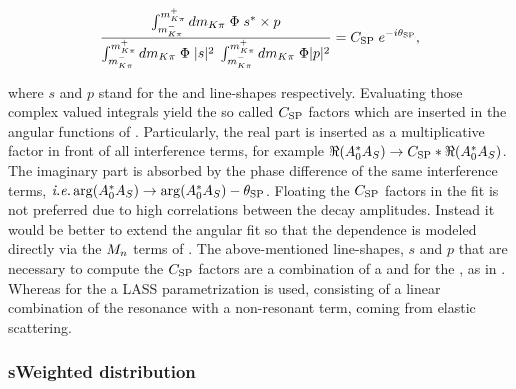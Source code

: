\begin{equation}
  \centering
  \label{csp_def}
  \frac{\int_{\mkpi^-}^{\mkpi^+} d\mkpi \; \Phi \; s^* \times p} {\int_{\mkpi^-}^{\mkpi^+} d\mkpi \; \Phi \; |s|^2 \; \int_{\mkpi^-}^{\mkpi^+} d\mkpi \; \Phi |p|^2} = \CSP \; e^{-i\ThetaSP},
\end{equation}

\noindent where $s$ and $p$ stand for the \swave and \pwave line-shapes respectively. Evaluating those complex valued integrals yield
the so called $C_{\text{SP}}$ factors which are inserted in the angular functions of . Particularly, the real part
is inserted as a multiplicative factor in front of all \spwave interference terms, for example $\Re({A}_{0}^* {A}_{S}) \rightarrow C_{\text{SP}} * \Re({A}_{0}^* {A}_{S})$.
The imaginary part is absorbed by the phase difference of the same interference
terms, $\mbox{\itshape i.e.} \arg(A_0^*A_S) \rightarrow \arg(A_0^*A_S) - \theta_{\text{SP}}$. Floating the $C_{\text{SP}}$ factors in the fit is not preferred due
to high correlations between the decay amplitudes. Instead it would be better to extend the angular fit so that the \mkpi dependence
is modeled directly via the $M_{n}$ terms of . The above-mentioned line-shapes, $s$ and $p$ that are necessary
to compute the $C_{\text{SP}}$ factors are a combination of a \KstENT and \KstOFOZ for the \pwave, as in \cite{PhysRevD.11.3165}.
Whereas for the \swave a LASS parametrization \cite{Aston1988493} is used, consisting of a linear combination of the \KstOFTZ resonance with
a non-resonant term, coming from elastic scattering.

\subsubsection{sWeighted \mkpi distribution}

